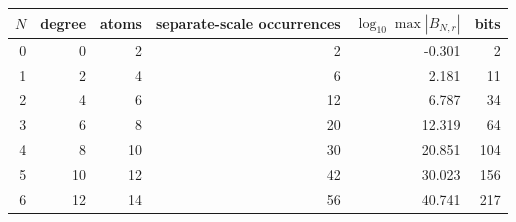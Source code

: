 \begin{tabular}{@{}rrrrrr@{}}
\toprule
$N$ & degree & atoms & separate-scale occurrences & $\log_{10}\max|B_{N,r}|$ & bits\\
\midrule
0 & 0 & 2 & 2 & -0.301 & 2\\
1 & 2 & 4 & 6 & 2.181 & 11\\
2 & 4 & 6 & 12 & 6.787 & 34\\
3 & 6 & 8 & 20 & 12.319 & 64\\
4 & 8 & 10 & 30 & 20.851 & 104\\
5 & 10 & 12 & 42 & 30.023 & 156\\
6 & 12 & 14 & 56 & 40.741 & 217\\
\bottomrule
\end{tabular}
